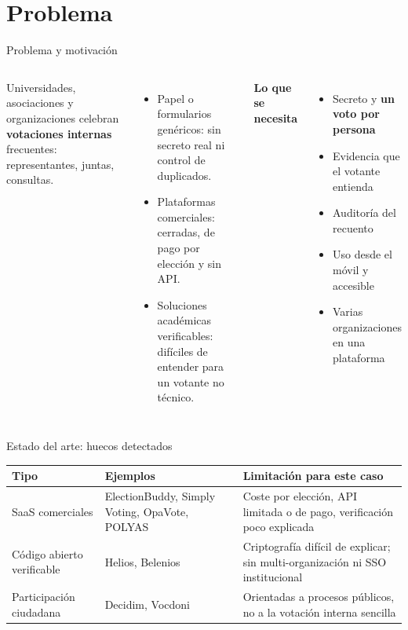 \documentclass[aspectratio=169,11pt]{beamer}
\begin{document}
\section{Problema}
\begin{frame}{Problema y motivación}
  \begin{columns}[T]
    Universidades, asociaciones y organizaciones celebran \textbf{votaciones internas} frecuentes:
    representantes, juntas, consultas.
    \begin{itemize}
      \item Papel o formularios genéricos: sin secreto real ni control de duplicados.
      \item Plataformas comerciales: cerradas, de pago por elección y sin API.
      \item Soluciones académicas verificables: difíciles de entender para un votante no técnico.
    \end{itemize}
    \textbf{Lo que se necesita}
    \begin{itemize}
      \item Secreto y \textbf{un voto por persona}
      \item Evidencia que el votante entienda
      \item Auditoría del recuento
      \item Uso desde el móvil y accesible
      \item Varias organizaciones en una plataforma
    \end{itemize}
  \end{columns}
\end{frame}

\begin{frame}{Estado del arte: huecos detectados}
  \footnotesize
  \begin{tabular}{@{}>{\raggedright\arraybackslash}p{}>{\raggedright\arraybackslash}p{}>{\raggedright\arraybackslash}p{}@{}}
    \toprule
    \textbf{Tipo} & \textbf{Ejemplos} & \textbf{Limitación para este caso}\\
    \midrule
    SaaS comerciales & ElectionBuddy, Simply Voting, OpaVote, POLYAS & Coste por elección, API limitada o de pago, verificación poco explicada \\
    Código abierto verificable & Helios, Belenios & Criptografía difícil de explicar; sin multi-organización ni SSO institucional \\
    Participación ciudadana & Decidim, Vocdoni & Orientadas a procesos públicos, no a la votación interna sencilla \\
    \bottomrule
  \end{tabular}
  \vspace{10pt}
\end{frame}
\end{document}
